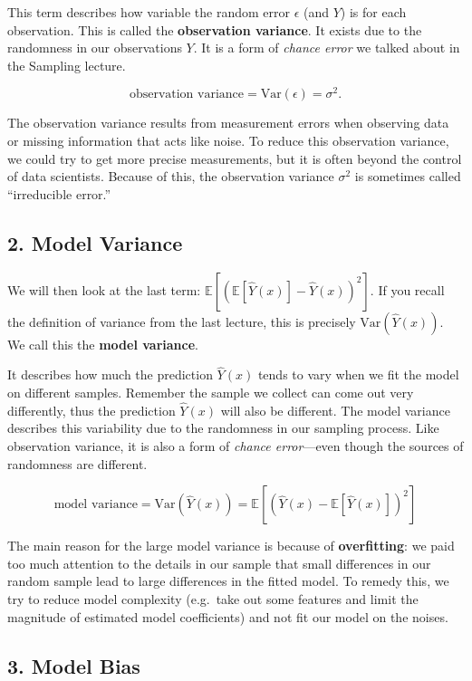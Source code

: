 \documentclass[
  letterpaper,
  DIV=11,
  numbers=noendperiod]{scrreprt}
\begin{document}
This term describes how variable the random error \(\epsilon\) (and
\(Y\)) is for each observation. This is called the \textbf{observation
variance}. It exists due to the randomness in our observations \(Y\). It
is a form of \emph{chance error} we talked about in the Sampling
lecture.

\[\text{observation variance} = \text{Var}(\epsilon) = \sigma^2.\]

The observation variance results from measurement errors when observing
data or missing information that acts like noise. To reduce this
observation variance, we could try to get more precise measurements, but
it is often beyond the control of data scientists. Because of this, the
observation variance \(\sigma^2\) is sometimes called ``irreducible
error.''

\subsection{2. Model Variance}\label{model-variance}

We will then look at the last term:
\(\mathbb{E}\left[\left(\mathbb{E}\left[\hat{Y}(x)\right] - \hat{Y}(x)\right)^2\right]\).
If you recall the definition of variance from the last lecture, this is
precisely \(\text{Var}(\hat{Y}(x))\). We call this the \textbf{model
variance}.

It describes how much the prediction \(\hat{Y}(x)\) tends to vary when
we fit the model on different samples. Remember the sample we collect
can come out very differently, thus the prediction \(\hat{Y}(x)\) will
also be different. The model variance describes this variability due to
the randomness in our sampling process. Like observation variance, it is
also a form of \emph{chance error}---even though the sources of
randomness are different.

\[\text{model variance} = \text{Var}(\hat{Y}(x)) = \mathbb{E}\left[\left(\hat{Y}(x) - \mathbb{E}\left[\hat{Y}(x)\right]\right)^2\right]\]

The main reason for the large model variance is because of
\textbf{overfitting}: we paid too much attention to the details in our
sample that small differences in our random sample lead to large
differences in the fitted model. To remedy this, we try to reduce model
complexity (e.g.~take out some features and limit the magnitude of
estimated model coefficients) and not fit our model on the noises.

\subsection{3. Model Bias}\label{model-bias}
\end{document}
